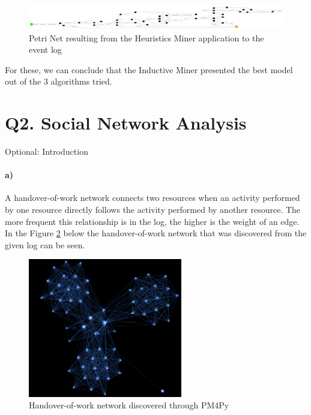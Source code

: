\documentclass[12pt]{report}
\begin{document}
\begin{figure}[h]
    \centering
    \includegraphics[width=\textwidth]{figures/q1_f_heuristics_miner.pdf}
    \caption{Petri Net resulting from the Heuristics Miner application to the event log}
    \label{fig:figures-q1_f_heuristics_miner-pdf}
\end{figure}

For these, we can conclude that the Inductive Miner presented the best model out of the 3 algorithms tried.

\section{Q2. Social Network Analysis}
\textlangle Optional: Introduction \textrangle
\paragraph{a)} 

A handover-of-work network connects two resources when an activity performed by one resource directly follows the activity performed by another resource. The more frequent this relationship is in the log, the higher is the weight of an edge. In the Figure \ref{fig:figures-q2_handover-png} below the handover-of-work network that was discovered from the given log can be seen.

\begin{figure}[h]
    \centering
    \includegraphics[width=0.6\textwidth]{figures/q2_handover.png}
    \caption{Handover-of-work network discovered through PM4Py}
    \label{fig:figures-q2_handover-png}
\end{figure}
\end{document}
